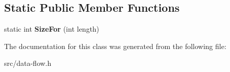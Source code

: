 \subsection*{Static Public Member Functions}
\begin{DoxyCompactItemize}
\item 
\hypertarget{classv8_1_1internal_1_1_bit_vector_adc077289e0cf2fa2744184695a771c6c}{}static int {\bfseries Size\+For} (int length)\label{classv8_1_1internal_1_1_bit_vector_adc077289e0cf2fa2744184695a771c6c}

\end{DoxyCompactItemize}


The documentation for this class was generated from the following file\+:\begin{DoxyCompactItemize}
\item 
src/data-\/flow.\+h\end{DoxyCompactItemize}
